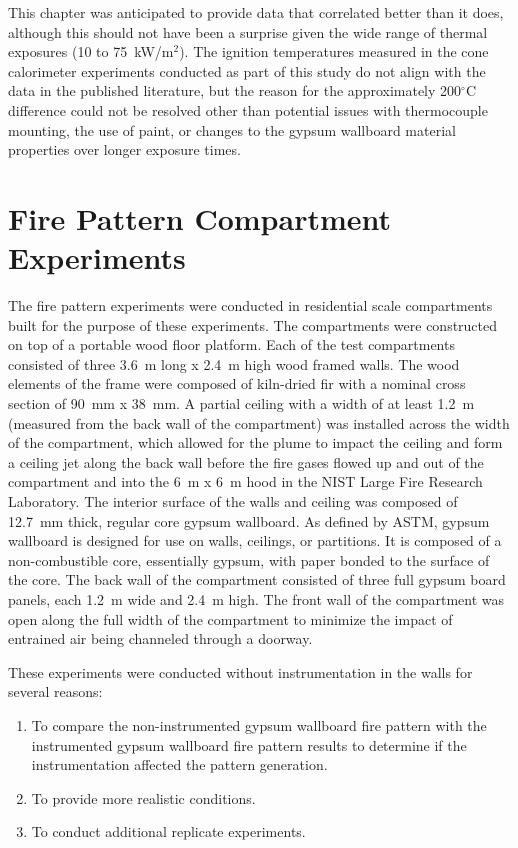 \documentclass[twoside]{uocthesis}
\begin{document}
{This chapter was anticipated to provide data that correlated better than it does, although this should not have been a surprise given the wide range of thermal exposures (10 to 75~kW/m$^2$).  The ignition temperatures measured in the cone calorimeter experiments conducted as part of this study do not align with the data in the published literature, but the reason for the approximately 200$^{\circ}$C difference could not be resolved other than potential issues with thermocouple mounting, the use of paint, or changes to the gypsum wallboard material properties over longer exposure times.       

\chapter{Fire Pattern Compartment Experiments}

The fire pattern experiments were conducted in residential scale compartments built for the purpose of these experiments.  The compartments were constructed on top of a portable wood floor platform.  Each of the test compartments consisted of three 3.6~m long x 2.4~m high wood framed walls. The wood elements of the frame were composed of kiln-dried fir with a nominal cross section of 90~mm x 38~mm.  A partial ceiling with a width of at least 1.2~m (measured from the back wall of the compartment) was installed across the width of the compartment, which allowed for the plume to impact the ceiling and form a ceiling jet along the back wall before the fire gases flowed up and out of the compartment and into the 6~m x 6~m hood in the NIST Large Fire Research Laboratory. The interior surface of the walls and ceiling was composed of 12.7~mm thick, regular core gypsum wallboard. As defined by ASTM, gypsum wallboard is designed for use on walls, ceilings, or partitions.  It is composed of a non-combustible core, essentially gypsum, with paper bonded to the surface of the core. The back wall of the compartment consisted of three full gypsum board panels, each 1.2~m wide and 2.4~m high.  The front wall of the compartment was open along the full width of the compartment to minimize the impact of entrained air being channeled through a doorway. 

These experiments were conducted without instrumentation in the walls for several reasons:
\begin{enumerate}
\item To compare the non-instrumented gypsum wallboard fire pattern with the instrumented gypsum wallboard fire pattern results to determine if the instrumentation affected the pattern generation.
\item To provide more realistic conditions.
\item To conduct additional replicate experiments.
\end{enumerate}

}
\end{document}
